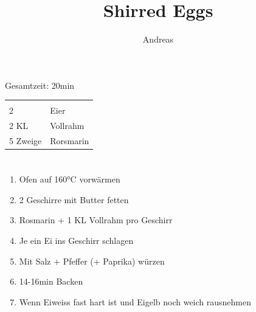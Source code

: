 \documentclass[12pt]{article}
\title{Shirred Eggs}
\author{Andreas}
\begin{document}
\maketitle
\thispagestyle{empty}

Gesamtzeit: 20min

\vspace*{1cm}

\begin{tabular}{l l}
  \hline & \\ [-1.5ex]
  2 & Eier  \\
  2 KL & Vollrahm  \\
  5 Zweige & Rorsmarin  \\
  \hline
\end{tabular}

\section*{}
\begin{enumerate}
  \item Ofen auf 160°C vorwärmen
  \item 2 Geschirre mit Butter fetten
  \item Rosmarin + 1 KL Vollrahm pro Geschirr
  \item Je ein Ei ins Geschirr schlagen
  \item Mit Salz + Pfeffer (+ Paprika) würzen
  \item 14-16min Backen
  \item Wenn Eiweiss fast hart ist und Eigelb noch weich rausnehmen
\end{enumerate}
\end{document}
